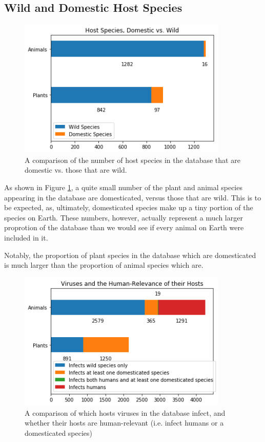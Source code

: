 \documentclass[12pt]{article}
\begin{document}
    \subsection{Wild and Domestic Host Species}

    \begin{figure}[H]
        \begin{center}
            \includegraphics[width=100mm]{host_species_domestic_wild_figure.png}
            \caption{A comparison of the number of host species in the database
            that are domestic vs. those that are wild.}
            \label{host_species_domestic_wild_figure}
        \end{center}
    \end{figure}

    As shown in Figure \ref{host_species_domestic_wild_figure}, a quite small
    number of the plant and animal species appearing in the database are
    domesticated, versus those that are wild. This is to be expected, as,
    ultimately, domesticated species make up a tiny portion of the species
    on Earth. These numbers, however, actually represent a much larger
    proprotion of the database than we would see if every animal on Earth
    were included in it.

    Notably, the proportion of plant species in the database which are
    domesticated is much larger than the proportion of animal species which
    are.

    \begin{figure}[H]
        \begin{center}
            \includegraphics[width=100mm]{viruses_human_relevance.png}
            \caption{A comparison of which hosts viruses in the database
            infect, and whether their hosts are human-relevant (i.e. infect
            humans or a domesticated species)}
            \label{viruses_human_relevance_figure}
        \end{center}
    \end{figure}
\end{document}
